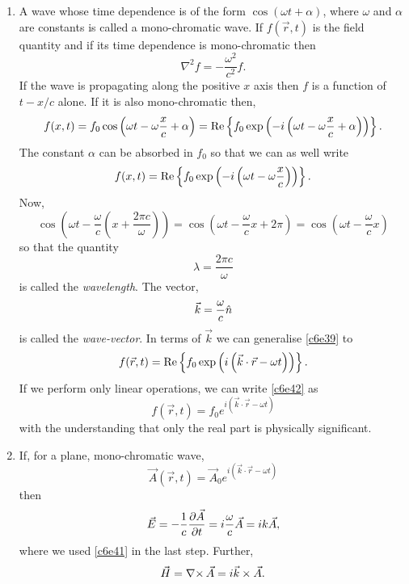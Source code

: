 \begin{enumerate}
\item A wave whose time dependence is of the form $\cos(\omega t + \alpha)$, 
where $\omega$ and $\alpha$ are constants is called a mono-chromatic wave. If 
$f(\vec{r}, t)$ is the field quantity and if its time dependence is 
mono-chromatic then
\begin{equation}\label{c6e38}
\nabla^2 f = -\frac{\omega^2}{c^2} f.
\end{equation}
If the wave is propagating along the positive $x$ axis then $f$ is a function of
$t - x/c$ alone. If it is also mono-chromatic then,
\[
f(x, t) = f_0\cos\left(\omega t - \omega\frac{x}{c} + \alpha\right) = 
\operatorname{Re}\left\{f_0\exp\left(-i\left(\omega t - \omega\frac{x}{c} + 
\alpha\right)\right)\right\}.
\]
The constant $\alpha$ can be absorbed in $f_0$ so that we can as well write
\begin{equation}\label{c6e39}
f(x, t) = \operatorname{Re}\left\{f_0\exp\left(-i\left(\omega t - 
\omega\frac{x}{c}\right)\right)\right\}.
\end{equation}
Now,
\[
\cos\left(\omega t - \frac{\omega}{c}
\left(x + \frac{2\pi c}{\omega}\right)\right)
= \cos\left(\omega t - \frac{\omega}{c}x + 2\pi\right) = 
\cos\left(\omega t - \frac{\omega}{c}x\right)
\]
so that the quantity
\begin{equation}\label{c6e40}
\lambda = \frac{2\pi c}{\omega}
\end{equation}
is called the \emph{wavelength}. The vector,
\begin{equation}\label{c6e41}
\vec{k} = \frac{\omega}{c}\hat{n}
\end{equation}
is called the \emph{wave-vector}. In terms of $\vec{k}$ we can generalise 
\eqref{c6e39} to
\begin{equation}\label{c6e42}
f(\vec{r}, t) = \operatorname{Re}\left\{f_0\exp\left(i\left(\vec{k}\cdot\vec{r} - 
\omega t\right)\right)\right\}.
\end{equation}
If we perform only linear operations, we can write \eqref{c6e42} as
\begin{equation}\label{c6e43}
f(\vec{r}, t) = f_0e^{i(\vec{k}\cdot\vec{r} - \omega t)}
\end{equation}
with the understanding that only the real part is physically significant.

\item If, for a plane, mono-chromatic wave,
\begin{equation}\label{c6e44}
\vec{A}(\vec{r}, t) = \vec{A}_0e^{i(\vec{k}\cdot\vec{r} - \omega t)}
\end{equation}
then
\begin{equation}\label{c6e45}
\vec{E} = -\frac{1}{c}\frac{\partial{\vec{A}}}{\partial{t}} = i\frac{\omega}{c}\vec{A} = ik\vec{A},
\end{equation}
where we used \eqref{c6e41} in the last step. Further,
\begin{equation}\label{c6e46}
\vec{H} = \operatorname{\nabla\times}\vec{A} = i\vec{k}\times\vec{A}.
\end{equation}


\end{enumerate}
